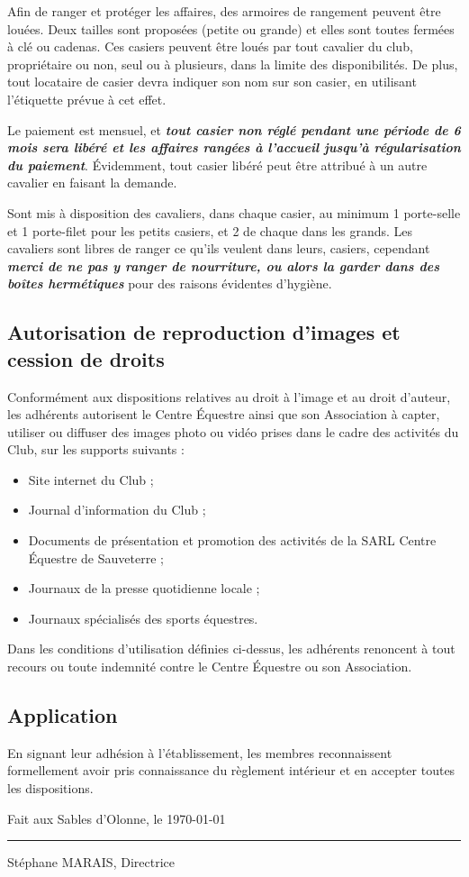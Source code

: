 \documentclass[11pt,a4paper]{article}
\begin{document}
Afin de ranger et protéger les affaires, des armoires de rangement peuvent être louées.
Deux tailles sont proposées (petite ou grande) et elles sont toutes fermées à clé ou cadenas.
Ces \og casiers \fg{} peuvent être loués par tout cavalier du club, propriétaire ou non, seul ou à plusieurs, dans la limite des disponibilités.
De plus, tout locataire de casier devra indiquer son nom sur son casier, en utilisant l'étiquette prévue à cet effet.

Le paiement est mensuel, et \textit{\textbf{tout casier non réglé pendant une période de 6 mois sera libéré et les affaires rangées à l'accueil jusqu'à régularisation du paiement}}.
Évidemment, tout casier libéré peut être attribué à un autre cavalier en faisant la demande.

Sont mis à disposition des cavaliers, dans chaque casier, au minimum 1 porte-selle et 1 porte-filet pour les petits casiers, et 2 de chaque dans les grands.
Les cavaliers sont libres de ranger ce qu'ils veulent dans leurs, casiers, cependant \textit{\textbf{merci de ne pas y ranger de nourriture, ou alors la garder dans des boîtes hermétiques}} pour des raisons évidentes d'hygiène.

\subsection{Autorisation de reproduction d'images et cession de droits}\label{subsec:autorisation-de-reproduction-d'images-et-cession-de-droits}
Conformément aux dispositions relatives au droit à l'image et au droit d'auteur, les adhérents autorisent le Centre Équestre ainsi que son Association à capter, utiliser ou diffuser des images photo ou vidéo prises dans le cadre des activités du Club, sur les supports suivants :
\begin{itemize}
\item
Site internet du Club ;
\item
Journal d'information du Club ;
\item
Documents de présentation et promotion des activités de la SARL Centre Équestre de Sauveterre ;
\item
Journaux de la presse quotidienne locale ;
\item
Journaux spécialisés des sports équestres.
\end{itemize}
Dans les conditions d'utilisation définies ci-dessus, les adhérents renoncent à tout recours ou toute indemnité contre le Centre Équestre ou son Association.

\subsection{Application}\label{subsec:application}
En signant leur adhésion à l'établissement, les membres reconnaissent formellement avoir pris connaissance du règlement intérieur et en accepter toutes les dispositions.

\vfill

Fait aux Sables d'Olonne, le \today

\vspace{2cm}

\begin{flushright}
\rule{6cm}{0.5pt}

{Stéphane MARAIS, Directrice \kern 9pt}

\end{flushright}
\end{document}
